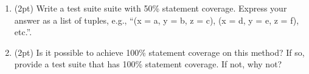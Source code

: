 \documentclass{report}
\newif\ifkey
\newcommand{\answerlong}[1]{\ifkey\color{red}\textbf{#1}\color{black}\else\vspace{0.5in}\fi\xspace}
\newcommand*{\pts}[1]{\addtocounter{points}{#1}(#1pt)}
\begin{document}
\begin{spacing}{1.4}
\begin{enumerate}[leftmargin=*]
\begin{enumerate}
  \item \pts{2} Select one of your answers to the previous question. Give a one-sentence justification for why your change
  improves the method's code-level design.

  \answerlong{For 1. above: ``avoid magic numbers'' or ``more self-documenting''. For 2. above: ``radius'' is more descriptive than ``r'', or ``compute'' is a verb, but the method returns a noun-like type.}

  \end{enumerate}
  
 \noindent Questions \ref{sl1} to \ref{el1} concern the following method:

  \begin{lstlisting}
    void foo(int x, int y, int z) {
      if (x > 5) {
        // STATEMENT 1
      else if (y < 4 && x > 7) {
        // STATEMENT 2
      }
      if (z < 6) {
        // STATEMENT 3
      } else {
        // STATEMENT 4
      }
    }
  \end{lstlisting}

  Assume that the only statements we are interested in are \lstinline{STATEMENT 1} through \lstinline{STATEMENT 4}.

  \item \label{sl1} \pts{2} Write a test suite suite with 50\% statement coverage. Express your answer as a list of tuples, e.g., ``(x = a, y = b, z = c), (x = d, y = e, z = f), etc.''. \\
  \answerlong{(x = 6, y = 0, z = 3)}
    
  \item \pts{2} Is it possible to achieve 100\% statement coverage on this method? If so, provide a test suite that has 100\% statement coverage. If not, why not? \\
    \answerlong{It is not possible, because STATEMENT 2 is unreachable.}


\end{enumerate}
\end{spacing}
\end{document}
